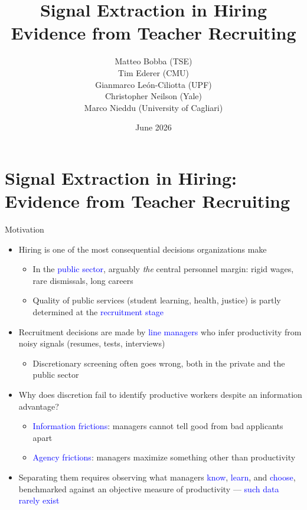 \documentclass[compress,10pt,aspectratio=169]{beamer}
\title[Signal Extraction in Hiring]{\LARGE{Signal Extraction in Hiring}\\ \Large{Evidence from Teacher Recruiting}}
\date[June 2026]{June 2026}
\author[Gianmarco Le\'on-Ciliotta (UPF)]{Matteo Bobba (TSE)\\ Tim Ederer (CMU)\\ Gianmarco Le\'on-Ciliotta (UPF)\\ Christopher Neilson (Yale)\\ Marco Nieddu (University of Cagliari)}
\newcommand\emphblue[1]{\textcolor{blue}{#1}}
\begin{document}
{
\begin{frame}
\titlepage
\end{frame}
} %

\section{Signal Extraction in Hiring: Evidence from Teacher Recruiting}

\begin{frame}{Motivation}
    \begin{itemize}
        \item Hiring is one of the most consequential decisions organizations make
        \smallskip
        \begin{itemize}
            \item[$\Rightarrow$] In the \emphblue{public sector}, arguably \emph{the} central personnel margin: rigid wages, rare dismissals, long careers
            \smallskip
            \item[$\Rightarrow$] Quality of public services (student learning, health, justice) is partly determined at the \emphblue{recruitment stage}
        \end{itemize}
        \medskip
        \item Recruitment decisions are made by \emphblue{line managers} who infer productivity from noisy signals (resumes, tests, interviews)
        \begin{itemize}
        \smallskip
            \item[$\Rightarrow$] Discretionary screening often goes wrong, both in the private and the public sector
        \end{itemize}
        \medskip
        \item Why does discretion fail to identify productive workers despite an information advantage?
        \begin{itemize}
        \smallskip
        \item[$\Rightarrow$] \emphblue{Information frictions}: managers cannot tell good from bad applicants apart
        \medskip
        \item[$\Rightarrow$] \emphblue{Agency frictions}: managers maximize something other than productivity
        \end{itemize}
        \medskip
        \item Separating them requires observing what managers \emphblue{know}, \emphblue{learn}, and \emphblue{choose}, benchmarked against an objective measure of productivity --- \emphblue{such data rarely exist}
    \end{itemize}
\end{frame}
\end{document}
